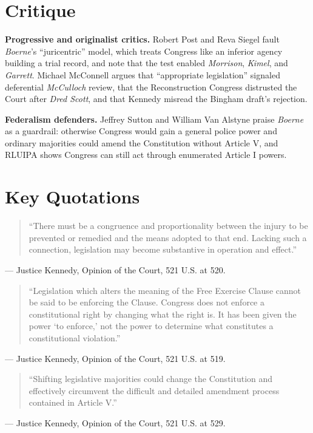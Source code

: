 \documentclass[12pt]{article}
\begin{document}
\section{Critique}

\textbf{Progressive and originalist critics.} Robert Post and Reva Siegel fault \textit{Boerne}'s ``juricentric'' model, which treats Congress like an inferior agency building a trial record, and note that the test enabled \textit{Morrison}, \textit{Kimel}, and \textit{Garrett}. Michael McConnell argues that ``appropriate legislation'' signaled deferential \textit{McCulloch} review, that the Reconstruction Congress distrusted the Court after \textit{Dred Scott}, and that Kennedy misread the Bingham draft's rejection.

\textbf{Federalism defenders.} Jeffrey Sutton and William Van Alstyne praise \textit{Boerne} as a guardrail: otherwise Congress would gain a general police power and ordinary majorities could amend the Constitution without Article V, and RLUIPA shows Congress can still act through enumerated Article I powers.

\section{Key Quotations}

\begin{quote}
``There must be a congruence and proportionality between the injury to be prevented or remedied and the means adopted to that end. Lacking such a connection, legislation may become substantive in operation and effect.''
\end{quote}
\noindent --- Justice Kennedy, Opinion of the Court, 521 U.S. at 520.

\begin{quote}
``Legislation which alters the meaning of the Free Exercise Clause cannot be said to be enforcing the Clause. Congress does not enforce a constitutional right by changing what the right is. It has been given the power `to enforce,' not the power to determine what constitutes a constitutional violation.''
\end{quote}
\noindent --- Justice Kennedy, Opinion of the Court, 521 U.S. at 519.

\begin{quote}
``Shifting legislative majorities could change the Constitution and effectively circumvent the difficult and detailed amendment process contained in Article V.''
\end{quote}
\noindent --- Justice Kennedy, Opinion of the Court, 521 U.S. at 529.
\end{document}
